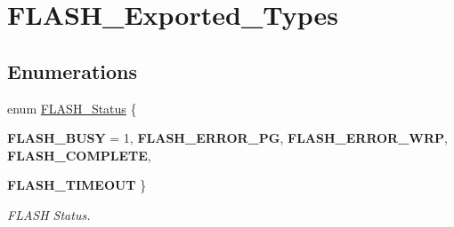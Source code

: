 \hypertarget{group__FLASH__Exported__Types}{
\section{FLASH\_\-Exported\_\-Types}
\label{group__FLASH__Exported__Types}
}
\subsection*{Enumerations}
\begin{DoxyCompactItemize}
\item 
enum \hyperlink{group__FLASH__Exported__Types_gadc63a6f3404ff1f71229a66915e9cdc0}{FLASH\_\-Status} \{ \par
{\bfseries FLASH\_\-BUSY} =  1, 
{\bfseries FLASH\_\-ERROR\_\-PG}, 
{\bfseries FLASH\_\-ERROR\_\-WRP}, 
{\bfseries FLASH\_\-COMPLETE}, 
\par
{\bfseries FLASH\_\-TIMEOUT}
 \}
\begin{DoxyCompactList}\small\item\em FLASH Status. \item\end{DoxyCompactList}\end{DoxyCompactItemize}
